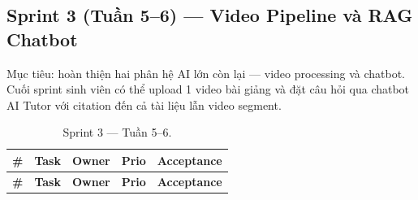 \subsection{Sprint 3 (Tuần 5--6) --- Video Pipeline và RAG Chatbot}
\label{subsec:sprint3-gd2}

Mục tiêu: hoàn thiện hai phân hệ AI lớn còn lại --- video processing và
chatbot. Cuối sprint sinh viên có thể upload 1 video bài giảng và đặt
câu hỏi qua chatbot AI Tutor với citation đến cả tài liệu lẫn video
segment.

\begin{longtable}{|p{0.7cm}|p{6.3cm}|p{1.2cm}|p{1cm}|p{3cm}|}
    \caption{Sprint 3 --- Tuần 5--6.}
    \label{tab:sprint3-gd2} \\
    \hline
    \textbf{\#} & \textbf{Task} & \textbf{Owner} & \textbf{Prio} & \textbf{Acceptance} \\
    \hline
    \endfirsthead
    \hline
    \textbf{\#} & \textbf{Task} & \textbf{Owner} & \textbf{Prio} & \textbf{Acceptance} \\
    \hline
    \endhead


\end{longtable}

